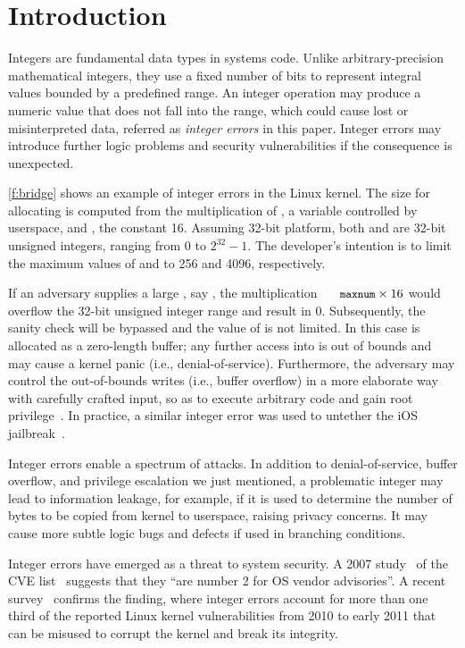 \section{Introduction}
\label{s:intro}

Integers are fundamental data types in systems code.  Unlike
arbitrary-precision mathematical integers, they use a fixed number
of bits to represent integral values bounded by a predefined range.
An integer operation may produce a numeric value that does not fall
into the range, which could cause lost or misinterpreted data, referred
as \emph{integer errors} in this paper.  Integer errors may introduce
further logic problems and security vulnerabilities if the consequence
is unexpected.

\autoref{f:bridge} shows an example of integer errors in the Linux
kernel.  The size for allocating  is computed from the
multiplication of , a variable controlled by userspace,
and , the constant 16.  Assuming
32-bit platform, both  and  are 32-bit unsigned
integers, ranging from 0 to $2^{32} - 1$.
The developer's intention is to limit the maximum values of 
 and  to 256 and 4096, respectively.

If an adversary supplies a large , say ,
the multiplication $\cc{maxnum} \times 16$ would overflow the 32-bit
unsigned integer range and result in 0.  Subsequently, the sanity
check will be bypassed and the value of  is not limited.
In this case  is allocated as a zero-length buffer; any
further access into  is out of bounds and may cause a kernel
panic (i.e., denial-of-service).  Furthermore, the adversary
may control the out-of-bounds writes (i.e., buffer overflow) in a
more elaborate way with carefully crafted input, so as to execute
arbitrary code and gain root privilege~\cite[CVE-2006-5751]{cve}.
In practice, a similar integer error was used to untether the iOS
jailbreak~\cite{esser:ios}.

Integer errors enable a spectrum of attacks.  In addition to
denial-of-service, buffer overflow, and privilege escalation we
just mentioned, a problematic integer may lead to information
leakage, for example, if it is used to determine the number of bytes
to be copied from kernel to userspace, raising privacy concerns.
It may cause more subtle logic bugs and defects if used in branching
conditions.

Integer errors have emerged as a threat to system security.  A 2007
study~\cite{christey:vuln} of the CVE list~\cite{cve} suggests that
they ``are number 2 for OS vendor advisories''.  A recent
survey~\cite{chen:kbugs} confirms the finding, where integer errors
account for more than one third of the reported Linux kernel
vulnerabilities from 2010 to early 2011 that can be misused to
corrupt the kernel and break its integrity.

